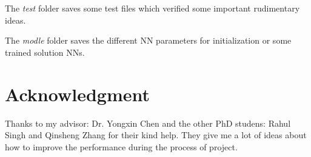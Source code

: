 \documentclass[conference,compsoc]{IEEEtran}
\begin{document}
The \textit{test} folder saves some test files which verified some important rudimentary ideas.

The \textit{modle} folder saves the different NN parameters for initialization or some trained solution NNs.

\section*{Acknowledgment}

Thanks to my advisor: Dr. Yongxin Chen and the other PhD studens: Rahul Singh and Qinsheng Zhang for their kind help. They give me a lot of ideas about how to improve the performance during the process of project.



\end{document}
